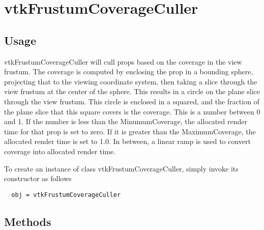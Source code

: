 \section{vtkFrustumCoverageCuller}

\subsection{Usage}

 vtkFrustumCoverageCuller will cull props based on the coverage in
 the view frustum. The coverage is computed by enclosing the prop in
 a bounding sphere, projecting that to the viewing coordinate system, then
 taking a slice through the view frustum at the center of the sphere. This
 results in a circle on the plane slice through the view frustum. This
 circle is enclosed in a squared, and the fraction of the plane slice that
 this square covers is the coverage. This is a number between 0 and 1.
 If the number is less than the MinumumCoverage, the allocated render time
 for that prop is set to zero. If it is greater than the MaximumCoverage,
 the allocated render time is set to 1.0. In between, a linear ramp is used
 to convert coverage into allocated render time.

To create an instance of class vtkFrustumCoverageCuller, simply
invoke its constructor as follows
\begin{verbatim}
  obj = vtkFrustumCoverageCuller
\end{verbatim}
\subsection{Methods}

